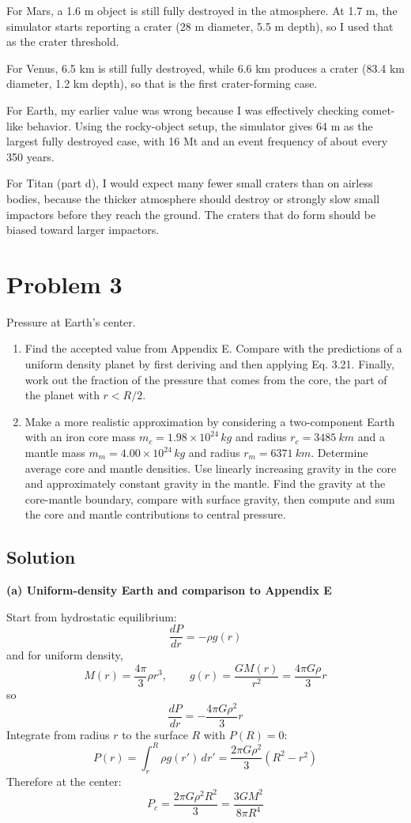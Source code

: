 \documentclass[11pt]{article}
\begin{document}
For Mars, a 1.6 m object is still fully destroyed in the atmosphere. At 1.7 m, the simulator starts
reporting a crater (28 m diameter, 5.5 m depth), so I used that as the crater threshold.

For Venus, 6.5 km is still fully destroyed, while 6.6 km produces a crater (83.4 km diameter,
1.2 km depth), so that is the first crater-forming case.

For Earth, my earlier value was wrong because I was effectively checking comet-like behavior.
Using the rocky-object setup, the simulator gives 64 m as the largest fully destroyed case,
with 16 Mt and an event frequency of about every 350 years.

For Titan (part d), I would expect many fewer small craters than on airless bodies, because the
thicker atmosphere should destroy or strongly slow small impactors before they reach the ground.
The craters that do form should be biased toward larger impactors.

\section*{Problem 3}
Pressure at Earth's center.
\begin{enumerate}[label=(\alph*)]
\item Find the accepted value from Appendix E. Compare with the predictions of a uniform
density planet by first deriving and then applying Eq. 3.21. Finally, work out the fraction
of the pressure that comes from the core, the part of the planet with $r < R/2$.
\item Make a more realistic approximation by considering a two-component Earth with an iron core
mass $m_c = 1.98 \times 10^{24}\,\si{kg}$ and radius $r_c = \SI{3485}{km}$ and a mantle
mass $m_m = 4.00 \times 10^{24}\,\si{kg}$ and radius $r_m = \SI{6371}{km}$. Determine average
core and mantle densities. Use linearly increasing gravity in the core and approximately constant
gravity in the mantle. Find the gravity at the core-mantle boundary, compare with surface gravity,
then compute and sum the core and mantle contributions to central pressure.
\end{enumerate}

\subsection*{Solution}
\textbf{(a) Uniform-density Earth and comparison to Appendix E}

Start from hydrostatic equilibrium:
\[
\frac{dP}{dr}=-\rho g(r)
\]
and for uniform density,
\[
M(r)=\frac{4\pi}{3}\rho r^3,
\qquad
g(r)=\frac{GM(r)}{r^2}=\frac{4\pi G\rho}{3}r
\]
so
\[
\frac{dP}{dr}=-\frac{4\pi G\rho^2}{3}r
\]
Integrate from radius $r$ to the surface $R$ with $P(R)=0$:
\[
P(r)=\int_r^R \rho g(r')\,dr'
=\frac{2\pi G\rho^2}{3}(R^2-r^2)
\]
Therefore at the center:
\[
P_c=\frac{2\pi G\rho^2R^2}{3}
=\frac{3GM^2}{8\pi R^4}
\]
\end{document}
